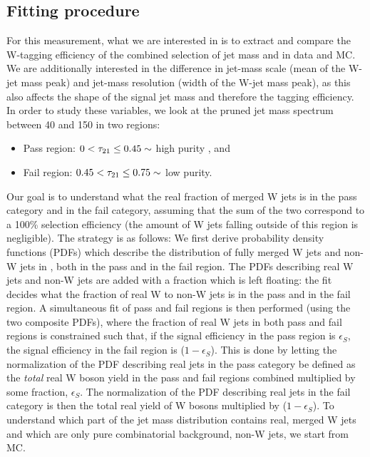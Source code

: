 \subsection{Fitting procedure}
For this measurement, what we are interested in is to extract and compare the W-tagging efficiency of the combined selection of jet mass and \nsubj in data and MC. We are additionally interested in the difference in jet-mass scale (mean of the W-jet mass peak) and jet-mass resolution (width of the W-jet mass peak), as this also affects the shape of the signal jet mass and therefore the tagging efficiency. In order to study these variables, we look at the pruned jet mass spectrum between 40 and 150 \GeV in two regions: 
\begin{itemize}
\itemsep0em 
  \item Pass region: $0 <  \tau_{21} \leq 0.45 \sim$ high purity , and
  \item Fail region: $0.45 < \tau_{21} \leq 0.75\sim$ low purity.
\end{itemize}
Our goal is to understand what the real fraction of merged W jets is in the pass category and in the fail category, assuming that the sum of the two correspond to a 100\% selection efficiency (the amount of W jets falling outside of this region is negligible).
The strategy is as follows: We first derive probability density functions (PDFs) which describe the distribution of fully merged W jets and non-W jets in \ttbar, both in the pass and in the fail region. The PDFs describing real W jets and non-W jets are added with a fraction which is left floating: the fit decides what the fraction of real W to non-W jets is in the pass and in the fail region. A simultaneous fit of pass and fail regions is then performed (using the two composite PDFs), where the fraction of real W jets in both pass and fail regions is constrained such that, if the signal efficiency in the pass region is $\epsilon_S$, the signal efficiency in the fail region is ($1-\epsilon_S$). This is done by letting the normalization of the PDF describing real \PW jets in the pass category be defined as the \textit{total} real W boson yield in the pass and fail regions combined multiplied by some fraction, $\epsilon_S$. The normalization of the PDF describing real \PW jets in the fail category is then the total real yield of W bosons multiplied by ($1-\epsilon_S$).\newline
To understand which part of the \ttbar jet mass distribution contains real, merged W jets and which are only pure combinatorial background, non-W jets, we start from \ttbar MC.
